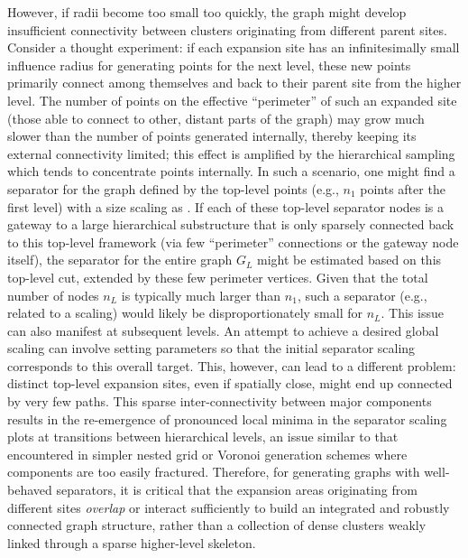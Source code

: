 However, if radii become too small too quickly, the graph might develop insufficient connectivity between clusters originating from different parent sites.
Consider a thought experiment: if each expansion site has an infinitesimally small influence radius for generating points for the next level, these new points primarily connect among themselves and back to their parent site from the higher level.
The number of points on the effective \enquote{perimeter} of such an expanded site (those able to connect to other, distant parts of the graph) may grow much slower than the number of points generated internally, thereby keeping its external connectivity limited; this effect is amplified by the hierarchical sampling which tends to concentrate points internally.
In such a scenario, one might find a separator for the graph defined by the top-level points (e.g., \(n_1\) points after the first level) with a size scaling as .
If each of these top-level separator nodes is a gateway to a large hierarchical substructure that is only sparsely connected back to this top-level framework (via few \enquote{perimeter} connections or the gateway node itself), the separator for the entire graph \(G_L\) might be estimated based on this top-level cut, extended by these few perimeter vertices.
Given that the total number of nodes \(n_L\) is typically much larger than \(n_1\), such a separator (e.g., related to a  scaling) would likely be disproportionately small for \(n_L\).
This issue can also manifest at subsequent levels.
An attempt to achieve a desired global  scaling can involve setting parameters so that the initial  separator scaling corresponds to this overall target.
This, however, can lead to a different problem: distinct top-level expansion sites, even if spatially close, might end up connected by very few paths.
This sparse inter-connectivity between major components results in the re-emergence of pronounced local minima in the separator scaling plots at transitions between hierarchical levels, an issue similar to that encountered in simpler nested grid or Voronoi generation schemes where components are too easily fractured.
Therefore, for generating graphs with well-behaved separators, it is critical that the expansion areas originating from different sites \emph{overlap} or interact sufficiently to build an integrated and robustly connected graph structure, rather than a collection of dense clusters weakly linked through a sparse higher-level skeleton. 

